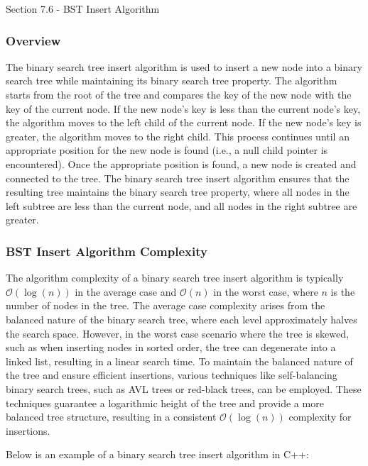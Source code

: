 \begin{notes}{Section 7.6 - BST Insert Algorithm}
    \subsubsection*{Overview}

    The binary search tree insert algorithm is used to insert a new node into a binary search tree while maintaining its binary search tree property. The algorithm starts from the root of the tree and compares the key of the new node with the key of the current node. If the new node's key is less than the current node's key, the algorithm 
    moves to the left child of the current node. If the new node's key is greater, the algorithm moves to the right child. This process continues until an appropriate position for the new node is found (i.e., a null child pointer is encountered). Once the appropriate position is found, a new node is created and connected to the tree. The binary 
    search tree insert algorithm ensures that the resulting tree maintains the binary search tree property, where all nodes in the left subtree are less than the current node, and all nodes in the right subtree are greater.
    
    \subsubsection*{BST Insert Algorithm Complexity}
    
    The algorithm complexity of a binary search tree insert algorithm is typically $\mathcal{O}(\log{(n)})$ in the average case and $\mathcal{O}(n)$ in the worst case, where $n$ is the number of nodes in the tree. The average case complexity arises from the balanced nature of the binary search tree, where each level approximately halves the search space. However, 
    in the worst case scenario where the tree is skewed, such as when inserting nodes in sorted order, the tree can degenerate into a linked list, resulting in a linear search time. To maintain the balanced nature of 
    the tree and ensure efficient insertions, various techniques like self-balancing binary search trees, such as AVL trees or red-black trees, can be employed. These techniques guarantee a logarithmic height of the tree and provide a more balanced tree structure, resulting in a consistent $\mathcal{O}(\log{(n)})$ complexity for insertions.
    
    \begin{highlight}
        Below is an example of a binary search tree insert algorithm in C++:
    

\end{highlight}
\end{notes}
